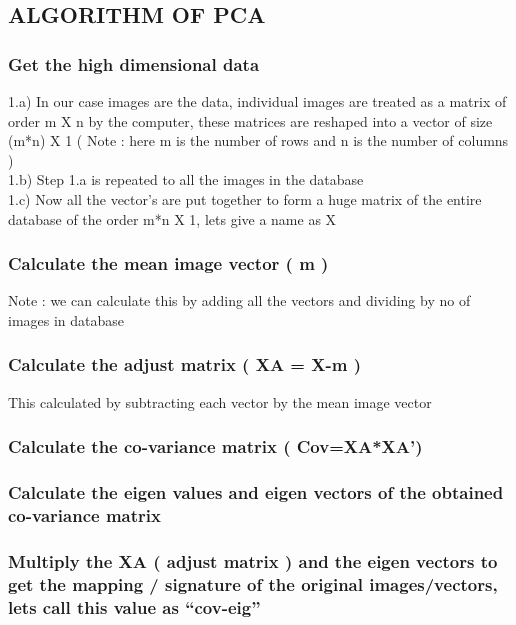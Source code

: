 \documentclass[10pt,a4paper]{article}
\begin{document}
\subsection{ALGORITHM OF PCA}

\subsubsection{Get the high dimensional data} 
    1.a)  In our case images are the data, individual images are treated as a matrix of order m X n by the computer, these matrices are reshaped into a vector of size (m*n) X 1 ( Note : here m is the number of rows and n is the number of columns ) \\
    1.b) Step 1.a is repeated to all the images in the database \\
    1.c) Now all the vector’s are put together to form a huge matrix of the entire database of the order m*n X 1, lets give a name as X \\

\subsubsection{Calculate the mean image vector  ( m )  } 

 Note : we can calculate this by adding all the vectors and dividing by  no of images in database

\subsubsection{Calculate the adjust matrix  ( XA = X-m ) }

    This calculated by subtracting each vector by the mean image vector

\subsubsection{ Calculate the co-variance matrix ( Cov=XA*XA’) }

\subsubsection{ Calculate the eigen values and eigen vectors of the obtained co-variance matrix }

\subsubsection{ Multiply the XA ( adjust matrix ) and the eigen vectors to get the mapping / signature of the original images/vectors, lets call this value as “cov-eig” }
\end{document}
